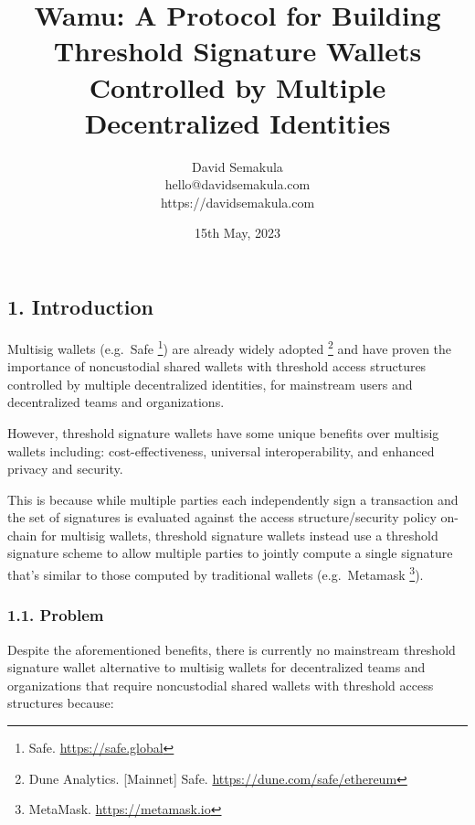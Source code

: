 \documentclass[
]{article}
\title{Wamu: A Protocol for Building Threshold Signature Wallets
Controlled by Multiple Decentralized Identities}
\author{David Semakula\\
hello@davidsemakula.com\\
https://davidsemakula.com}
\date{15th May, 2023}
\begin{document}
\maketitle

{
\setcounter{tocdepth}{3}
\tableofcontents
}
\hypertarget{introduction}{%
\subsection{1. Introduction}\label{introduction}}

Multisig wallets (e.g.~Safe \footnote{Safe. \url{https://safe.global}})
are already widely adopted \footnote{Dune Analytics. {[}Mainnet{]} Safe.
  \url{https://dune.com/safe/ethereum}} and have proven the importance
of noncustodial shared wallets with threshold access structures
controlled by multiple decentralized identities, for mainstream users
and decentralized teams and organizations.

However, threshold signature wallets have some unique benefits over
multisig wallets including: cost-effectiveness, universal
interoperability, and enhanced privacy and security.

This is because while multiple parties each independently sign a
transaction and the set of signatures is evaluated against the access
structure/security policy on-chain for multisig wallets, threshold
signature wallets instead use a threshold signature scheme to allow
multiple parties to jointly compute a single signature that's similar to
those computed by traditional wallets (e.g.~Metamask \footnote{MetaMask.
  \url{https://metamask.io}}).

\hypertarget{problem}{%
\subsubsection{1.1. Problem}\label{problem}}

Despite the aforementioned benefits, there is currently no mainstream
threshold signature wallet alternative to multisig wallets for
decentralized teams and organizations that require noncustodial shared
wallets with threshold access structures because:
\end{document}
